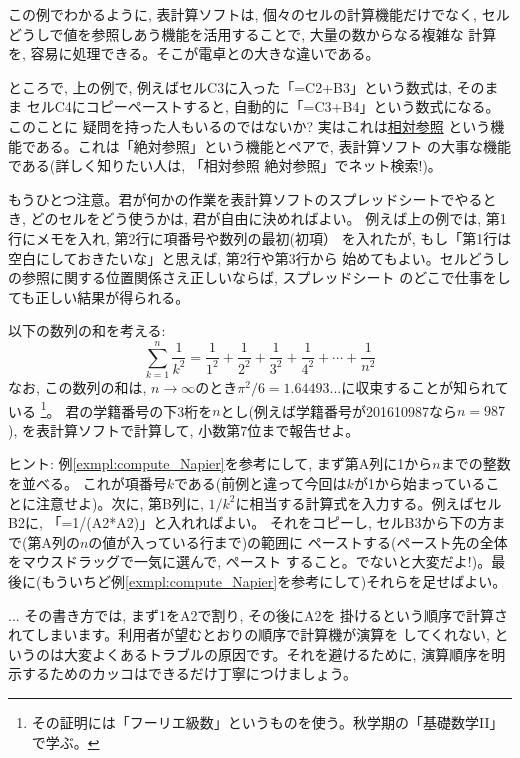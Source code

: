 この例でわかるように, 表計算ソフトは, 個々のセルの計算機能だけでなく, 
セルどうしで値を参照しあう機能を活用することで, 大量の数からなる複雑な
計算を, 容易に処理できる。そこが電卓との大きな違いである。\mv

ところで, 上の例で, 例えばセルC3に入った「=C2+B3」という数式は, そのまま
セルC4にコピーペーストすると, 自動的に「=C3+B4」という数式になる。このことに
疑問を持った人もいるのではないか? 実はこれは\underline{相対参照} 
という機能である。これは「絶対参照」という機能とペアで, 表計算ソフト
の大事な機能である(詳しく知りたい人は, 「相対参照 絶対参照」でネット検索!)。

もうひとつ注意。君が何かの作業を表計算ソフトのスプレッドシートでやるとき, 
どのセルをどう使うかは, 君が自由に決めればよい。
例えば上の例では, 第1行にメモを入れ, 第2行に項番号や数列の最初(初項）
を入れたが, もし「第1行は空白にしておきたいな」と思えば, 第2行や第3行から
始めてもよい。セルどうしの参照に関する位置関係さえ正しいならば, スプレッドシート
のどこで仕事をしても正しい結果が得られる。

\begin{q}\label{q:comp_sum1} 以下の数列の和を考える:
\begin{equation}
\sum_{k=1}^n\frac{1}{k^2}=
\frac{1}{1^2}+\frac{1}{2^2}+\frac{1}{3^2}+\frac{1}{4^2}+\cdots+\frac{1}{n^2}\label{eq:sum_rexip_n2}
\end{equation}
なお, この数列の和は, $n\rightarrow\infty$のとき$\pi^2/6=1.64493...$に収束することが知られている
\footnote{その証明には「フーリエ級数」というものを使う。秋学期の「基礎数学II」で学ぶ。}。
君の学籍番号の下3桁を$n$とし(例えば学籍番号が201610987なら$n=987$), 
を表計算ソフトで計算して, 小数第7位まで報告せよ。

ヒント: 例\ref{exmpl:compute_Napier}を参考にして, まず第A列に1から$n$までの整数を並べる。
これが項番号$k$である(前例と違って今回は$k$が1から始まっていることに注意せよ)。次に, 第B列に, 
$1/k^2$に相当する計算式を入力する。例えばセルB2に, 「=1/(A2*A2)」と入れればよい。
それをコピーし, セルB3から下の方まで(第A列の$n$の値が入っている行まで)の範囲に
ペーストする(ペースト先の全体をマウスドラッグで一気に選んで, ペースト
すること。でないと大変だよ!)。最後に(もういちど例\ref{exmpl:compute_Napier}を参考にして)それらを足せばよい。
\end{q}

\begin{freqmiss}{\small{} ... その書き方では, まず1をA2で割り, その後にA2を
掛けるという順序で計算されてしまいます。利用者が望むとおりの順序で計算機が演算を
してくれない, というのは大変よくあるトラブルの原因です。それを避けるために, 
演算順序を明示するためのカッコはできるだけ丁寧につけましょう。}\end{freqmiss}

